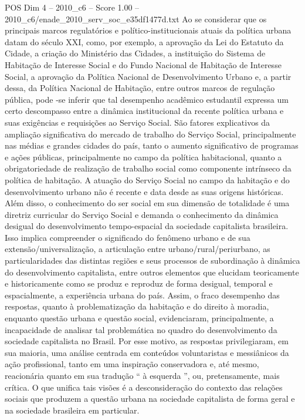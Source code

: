 \begin{textsample}{POS Dim 4 – 2010\_c6 – Score 1.00 – 2010\_c6/enade\_2010\_serv\_soc\_e35df1477d.txt}
Ao se considerar que os principais marcos regulatórios e político-institucionais atuais da política urbana datam do século XXI, como, por exemplo, a aprovação da Lei do Estatuto da Cidade, a criação do Ministério das Cidades, a instituição do Sistema de Habitação de Interesse Social e do Fundo Nacional de Habitação de Interesse Social, a aprovação da Política Nacional de Desenvolvimento Urbano e, a partir dessa, da Política Nacional de Habitação, entre outros marcos de regulação pública, pode -se inferir que tal desempenho acadêmico estudantil expressa um certo descompasso entre a dinâmica institucional da recente política urbana e suas exigências e requisições ao Serviço Social.
São fatores explicativos da ampliação significativa do mercado de trabalho do Serviço Social, principalmente nas médias e grandes cidades do país, tanto o aumento significativo de programas e ações públicas, principalmente no campo da política habitacional, quanto a obrigatoriedade de realização de trabalho social como componente intrínseco da política de habitação.
A atuação do Serviço Social no campo da habitação e do desenvolvimento urbano não é recente e data desde as suas origens históricas.
Além disso, o conhecimento do ser social em sua dimensão de totalidade é uma diretriz curricular do Serviço Social e demanda o conhecimento da dinâmica desigual do desenvolvimento tempo-espacial da sociedade capitalista brasileira.
Isso implica compreender o significado do fenômeno urbano e de sua extensão/universalização, a articulação entre urbano/rural/periurbano, as particularidades das distintas regiões e seus processos de subordinação à dinâmica do desenvolvimento capitalista, entre outros elementos que elucidam teoricamente e historicamente como se produz e reproduz de forma desigual, temporal e espacialmente, a experiência urbana do país.
Assim, o fraco desempenho das respostas, quanto à problematização da habitação e do direito à moradia, enquanto questão urbana e questão social, evidenciaram, principalmente, a incapacidade de analisar tal problemática no quadro do desenvolvimento da sociedade capitalista no Brasil.
Por esse motivo, as respostas privilegiaram, em sua maioria, uma análise centrada em conteúdos voluntaristas e messiânicos da ação profissional, tanto em uma inspiração conservadora e, até mesmo, reacionária quanto em sua tradução “ à esquerda ”, ou, pretensamente, mais crítica.
O que unifica tais visões é a desconsideração do contexto das relações sociais que produzem a questão urbana na sociedade capitalista de forma geral e na sociedade brasileira em particular.

\end{textsample}
